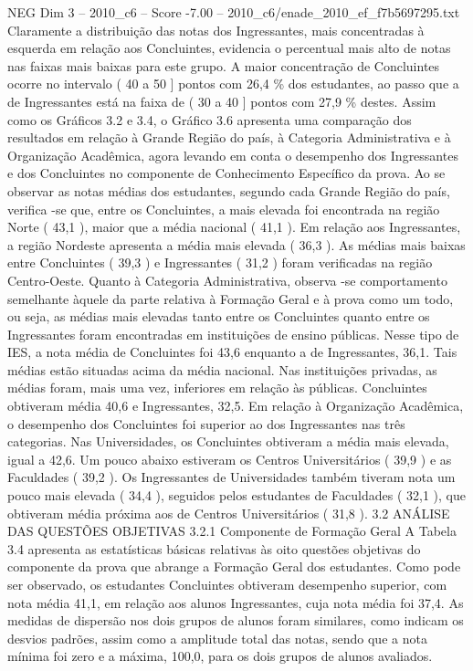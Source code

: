 \begin{textsample}{NEG Dim 3 – 2010\_c6 – Score -7.00 – 2010\_c6/enade\_2010\_ef\_f7b5697295.txt}
Claramente a distribuição das notas dos Ingressantes, mais concentradas à esquerda em relação aos Concluintes, evidencia o percentual mais alto de notas nas faixas mais baixas para este grupo.
A maior concentração de Concluintes ocorre no intervalo ( 40 a 50 ] pontos com 26,4 \% dos estudantes, ao passo que a de Ingressantes está na faixa de ( 30 a 40 ] pontos com 27,9 \% destes.
Assim como os Gráficos 3.2 e 3.4, o Gráfico 3.6 apresenta uma comparação dos resultados em relação à Grande Região do país, à Categoria Administrativa e à Organização Acadêmica, agora levando em conta o desempenho dos Ingressantes e dos Concluintes no componente de Conhecimento Específico da prova.
Ao se observar as notas médias dos estudantes, segundo cada Grande Região do país, verifica -se que, entre os Concluintes, a mais elevada foi encontrada na região Norte ( 43,1 ), maior que a média nacional ( 41,1 ).
Em relação aos Ingressantes, a região Nordeste apresenta a média mais elevada ( 36,3 ).
As médias mais baixas entre Concluintes ( 39,3 ) e Ingressantes ( 31,2 ) foram verificadas na região Centro-Oeste.
Quanto à Categoria Administrativa, observa -se comportamento semelhante àquele da parte relativa à Formação Geral e à prova como um todo, ou seja, as médias mais elevadas tanto entre os Concluintes quanto entre os Ingressantes foram encontradas em instituições de ensino públicas.
Nesse tipo de IES, a nota média de Concluintes foi 43,6 enquanto a de Ingressantes, 36,1.
Tais médias estão situadas acima da média nacional.
Nas instituições privadas, as médias foram, mais uma vez, inferiores em relação às públicas.
Concluintes obtiveram média 40,6 e Ingressantes, 32,5.
Em relação à Organização Acadêmica, o desempenho dos Concluintes foi superior ao dos Ingressantes nas três categorias.
Nas Universidades, os Concluintes obtiveram a média mais elevada, igual a 42,6.
Um pouco abaixo estiveram os Centros Universitários ( 39,9 ) e as Faculdades ( 39,2 ).
Os Ingressantes de Universidades também tiveram nota um pouco mais elevada ( 34,4 ), seguidos pelos estudantes de Faculdades ( 32,1 ), que obtiveram média próxima aos de Centros Universitários ( 31,8 ). 3.2 ANÁLISE DAS QUESTÕES OBJETIVAS 3.2.1 Componente de Formação Geral A Tabela 3.4 apresenta as estatísticas básicas relativas às oito questões objetivas do componente da prova que abrange a Formação Geral dos estudantes.
Como pode ser observado, os estudantes Concluintes obtiveram desempenho superior, com nota média 41,1, em relação aos alunos Ingressantes, cuja nota média foi 37,4.
As medidas de dispersão nos dois grupos de alunos foram similares, como indicam os desvios padrões, assim como a amplitude total das notas, sendo que a nota mínima foi zero e a máxima, 100,0, para os dois grupos de alunos avaliados.

\end{textsample}
